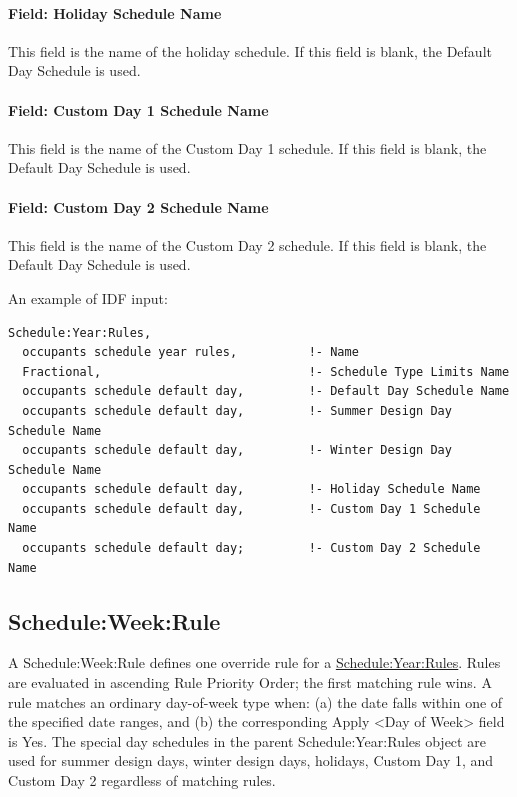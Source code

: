 \paragraph{Field: Holiday Schedule Name}\label{field-holiday-schedule-name-scheduleyearrules}

This field is the name of the holiday schedule. If this field is blank, the Default Day Schedule is used.

\paragraph{Field: Custom Day 1 Schedule Name}\label{field-custom-day-1-schedule-name-scheduleyearrules}

This field is the name of the Custom Day 1 schedule. If this field is blank, the Default Day Schedule is used.

\paragraph{Field: Custom Day 2 Schedule Name}\label{field-custom-day-2-schedule-name-scheduleyearrules}

This field is the name of the Custom Day 2 schedule. If this field is blank, the Default Day Schedule is used.

An example of IDF input:

\begin{lstlisting}
Schedule:Year:Rules,
  occupants schedule year rules,          !- Name
  Fractional,                             !- Schedule Type Limits Name
  occupants schedule default day,         !- Default Day Schedule Name
  occupants schedule default day,         !- Summer Design Day Schedule Name
  occupants schedule default day,         !- Winter Design Day Schedule Name
  occupants schedule default day,         !- Holiday Schedule Name
  occupants schedule default day,         !- Custom Day 1 Schedule Name
  occupants schedule default day;         !- Custom Day 2 Schedule Name
\end{lstlisting}

\subsection{Schedule:Week:Rule}\label{scheduleweekrule}

A Schedule:Week:Rule defines one override rule for a \hyperref[scheduleyearrules]{Schedule:Year:Rules}.
Rules are evaluated in ascending Rule Priority Order; the first matching rule wins.
A rule matches an ordinary day-of-week type when: (a) the date falls within one of the specified date ranges, and (b) the corresponding Apply \textless{}Day of Week\textgreater{} field is Yes.
The special day schedules in the parent Schedule:Year:Rules object are used for summer design days, winter design days, holidays, Custom Day 1, and Custom Day 2 regardless of matching rules.

